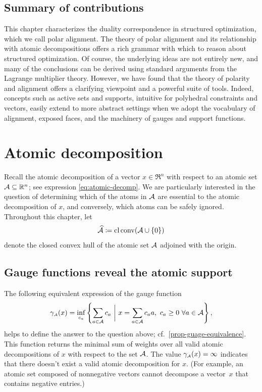 \subsection{Summary of contributions} \label{sec:conclusions}

This chapter characterizes the duality correspondence in structured optimization, which we call polar alignment. The theory of polar alignment and its relationship with atomic decompositions offers a rich grammar with which to reason about structured optimization. Of course, the underlying ideas are not entirely new, and many of the conclusions
can be derived using standard arguments from the Lagrange multiplier theory.
However, we have found that the theory of polarity and alignment offers a
clarifying viewpoint and a powerful suite of tools. Indeed, concepts such as
active sets and supports, intuitive for polyhedral constraints and
vectors, easily extend to more abstract settings when we adopt the vocabulary of
alignment, exposed faces, and the machinery of gauges and support functions. 

\section{Atomic decomposition} \label{sec:atomic-decomposition}
Recall the atomic decomposition of a vector $x\in\Re^n$ with respect to an atomic set $\mathcal{A}\subseteq\mathbb{R}^n$; see expression \eqref{eq:atomic-decomp}. We are particularly interested in the question of determining which of the atoms
in $\mathcal{A}$ are essential to the atomic decomposition of $x$, and conversely,
which atoms can be safely ignored. Throughout this chapter, let 
\[\widehat{\mathcal{A}} \coloneqq \operatorname{cl}\operatorname{conv}(\mathcal{A} \cup \{0\})\]
denote the closed convex hull of the atomic set $\mathcal{A}$ adjoined with the origin.

\subsection{Gauge functions reveal the atomic support}
The following equivalent expression of the gauge function 
\begin{equation}
    \label{eq:gauge2}
    \gamma_{\scriptscriptstyle\mathcal{A}}(x)
    = \inf_{c_a}
      \left\{ \sum_{a\in\mathcal{A}}c_a ~\bigg\vert~ x = \sum_{a\in\mathcal{A}}c_aa,\ c_a \ge0\ \forall a\in\mathcal{A} \right\},
\end{equation}
helps to define the answer to the question above; cf.~\autoref{prop-guage-equivalence}. This function returns the
minimal sum of weights over all valid atomic decompositions of $x$ with respect
to the set $\mathcal{A}$. The value $\gamma_{\scriptscriptstyle\mathcal{A}}(x)=\infty$ indicates that there doesn't
exist a valid atomic decomposition for $x$. (For example, an atomic set composed
of nonnegative vectors cannot decompose a vector~$x$ that contains negative entries.) 


